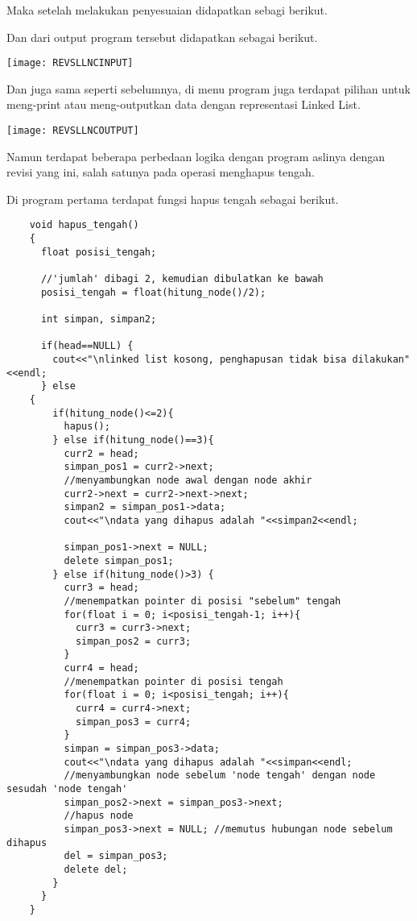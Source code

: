 \documentclass[12pt, a4paper]{article}
\begin{document}
  Maka setelah melakukan penyesuaian didapatkan sebagi berikut.

  \vspace{0.5cm}
  
  \vspace{0.5cm}

  Dan dari output program tersebut didapatkan sebagai berikut.

  \begin{center}
    \texttt{[image: REVSLLNCINPUT]}
  \end{center}

  Dan juga sama seperti sebelumnya, di menu program juga terdapat pilihan
  untuk meng-print atau meng-outputkan data dengan representasi Linked List.

  \begin{center}
    \texttt{[image: REVSLLNCOUTPUT]}
  \end{center}

  Namun terdapat beberapa perbedaan logika dengan program aslinya dengan revisi
  yang ini, salah satunya pada operasi menghapus tengah.

  Di program pertama terdapat fungsi hapus tengah sebagai berikut.

  \vspace{0.5cm}
  \begin{lstlisting}
    void hapus_tengah()
    {
      float posisi_tengah;

      //'jumlah' dibagi 2, kemudian dibulatkan ke bawah
      posisi_tengah = float(hitung_node()/2);

      int simpan, simpan2;

      if(head==NULL) {
        cout<<"\nlinked list kosong, penghapusan tidak bisa dilakukan"<<endl;
      } else
    {
        if(hitung_node()<=2){
          hapus();
        } else if(hitung_node()==3){
          curr2 = head;
          simpan_pos1 = curr2->next;
          //menyambungkan node awal dengan node akhir
          curr2->next = curr2->next->next;
          simpan2 = simpan_pos1->data;
          cout<<"\ndata yang dihapus adalah "<<simpan2<<endl;

          simpan_pos1->next = NULL;
          delete simpan_pos1;
        } else if(hitung_node()>3) {
          curr3 = head;
          //menempatkan pointer di posisi "sebelum" tengah
          for(float i = 0; i<posisi_tengah-1; i++){
            curr3 = curr3->next;
            simpan_pos2 = curr3;
          }
          curr4 = head;
          //menempatkan pointer di posisi tengah
          for(float i = 0; i<posisi_tengah; i++){
            curr4 = curr4->next;
            simpan_pos3 = curr4;
          }
          simpan = simpan_pos3->data;
          cout<<"\ndata yang dihapus adalah "<<simpan<<endl;
          //menyambungkan node sebelum 'node tengah' dengan node sesudah 'node tengah'
          simpan_pos2->next = simpan_pos3->next;
          //hapus node
          simpan_pos3->next = NULL; //memutus hubungan node sebelum dihapus
          del = simpan_pos3;
          delete del;
        }
      }
    }
  \end{lstlisting}
  \vspace{0.5cm}
\end{document}
